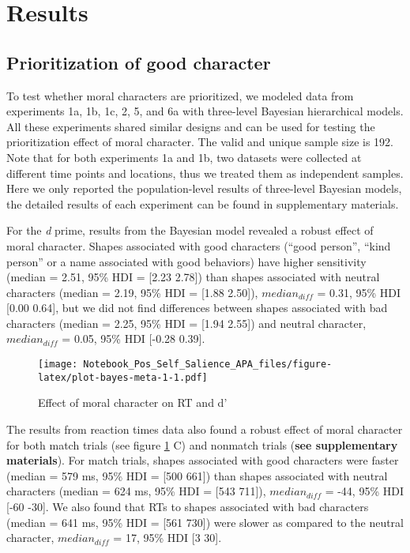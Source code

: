 \documentclass[
  man]{apa6}
\begin{document}
\hypertarget{results}{%
\section{Results}\label{results}}

\hypertarget{prioritization-of-good-character}{%
\subsection{Prioritization of good character}\label{prioritization-of-good-character}}

To test whether moral characters are prioritized, we modeled data from experiments 1a, 1b, 1c, 2, 5, and 6a with three-level Bayesian hierarchical models. All these experiments shared similar designs and can be used for testing the prioritization effect of moral character. The valid and unique sample size is 192. Note that for both experiments 1a and 1b, two datasets were collected at different time points and locations, thus we treated them as independent samples. Here we only reported the population-level results of three-level Bayesian models, the detailed results of each experiment can be found in supplementary materials.

For the \emph{d} prime, results from the Bayesian model revealed a robust effect of moral character. Shapes associated with good characters (``good person'', ``kind person'' or a name associated with good behaviors) have higher sensitivity (median = 2.51, 95\% HDI = {[}2.23 2.78{]}) than shapes associated with neutral characters (median = 2.19, 95\% HDI = {[}1.88 2.50{]}), \(median_{diff}\) = 0.31, 95\% HDI {[}0.00 0.64{]}, but we did not find differences between shapes associated with bad characters (median = 2.25, 95\% HDI = {[}1.94 2.55{]}) and neutral character, \(median_{diff}\) = 0.05, 95\% HDI {[}-0.28 0.39{]}.

\begin{figure}
\centering
\texttt{[image: Notebook\_Pos\_Self\_Salience\_APA\_files/figure-latex/plot-bayes-meta-1-1.pdf]}
\caption{\label{fig:plot-bayes-meta-1}Effect of moral character on RT and d'}
\end{figure}

The results from reaction times data also found a robust effect of moral character for both match trials (see figure \ref{fig:plot-bayes-meta-1} C) and nonmatch trials (\textbf{see supplementary materials}). For match trials, shapes associated with good characters were faster (median = 579 ms, 95\% HDI = {[}500 661{]}) than shapes associated with neutral characters (median = 624 ms, 95\% HDI = {[}543 711{]}), \(median_{diff}\) = -44, 95\% HDI {[}-60 -30{]}. We also found that RTs to shapes associated with bad characters (median = 641 ms, 95\% HDI = {[}561 730{]}) were slower as compared to the neutral character, \(median_{diff}\) = 17, 95\% HDI {[}3 30{]}.
\end{document}
